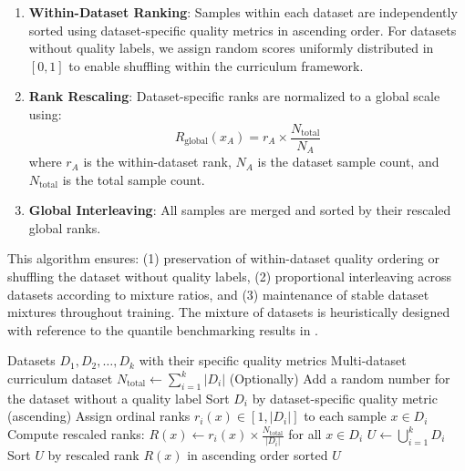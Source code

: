 \begin{enumerate}
    \item \textbf{Within-Dataset Ranking}: Samples within each dataset are independently sorted using dataset-specific quality metrics in ascending order. For datasets without quality labels, we assign random scores uniformly distributed in $[0,1]$ to enable shuffling within the curriculum framework.
    \item \textbf{Rank Rescaling}: Dataset-specific ranks are normalized to a global scale using:
    \[
    R_{\text{global}}(x_A) = r_A \times \frac{N_{\text{total}}}{N_A}
    \]
    where $r_A$ is the within-dataset rank, $N_A$ is the dataset sample count, and $N_{\text{total}}$ is the total sample count.
    
    \item \textbf{Global Interleaving}: All samples are merged and sorted by their rescaled global ranks.
\end{enumerate}

This algorithm ensures: (1) preservation of within-dataset quality ordering or shuffling the dataset without quality labels, (2) proportional interleaving across datasets according to mixture ratios, and (3) maintenance of stable dataset mixtures throughout training. The mixture of datasets is heuristically designed with reference to the quantile benchmarking results in .

\begin{algorithm}[t]
\caption{Multi-Dataset Curriculum Construction}
\label{alg:multi-domain-curriculum}
\begin{algorithmic}[1]
\Require Datasets $D_1, D_2, \dots, D_k$ with their specific quality metrics
\Ensure Multi-dataset curriculum dataset
\State $\displaystyle N_{\text{total}} \gets \sum_{i=1}^k |D_i|$ 
    \State (Optionally) Add a random number for the dataset without a quality label
    \State Sort $D_i$ by dataset-specific quality metric (ascending) 
    \State Assign ordinal ranks $r_i(x) \in [1, |D_i|]$ to each sample $x \in D_i$
    \State Compute rescaled ranks: $R(x) \gets r_i(x) \times \frac{N_{\text{total}}}{|D_i|}$ for all $x \in D_i$
\EndFor
\State $\displaystyle U \gets \bigcup_{i=1}^k D_i$ 
\State Sort $U$ by rescaled rank $R(x)$ in ascending order 
\State \Return sorted $U$
\end{algorithmic}
\end{algorithm}


